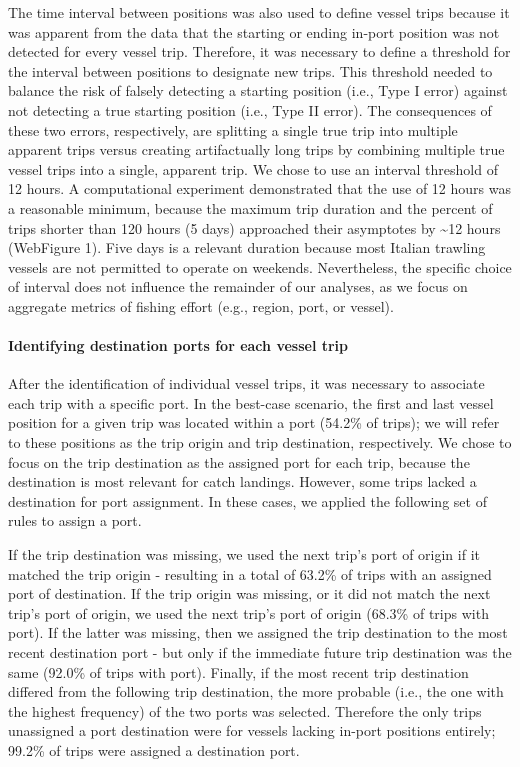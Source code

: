 \documentclass[11pt,]{article}
\let\oldparagraph\paragraph
\renewcommand{\paragraph}[1]{\oldparagraph{#1}\mbox{}}
\begin{document}
The time interval between positions was also used to define vessel trips
because it was apparent from the data that the starting or ending
in-port position was not detected for every vessel trip. Therefore, it
was necessary to define a threshold for the interval between positions
to designate new trips. This threshold needed to balance the risk of
falsely detecting a starting position (i.e., Type I error) against not
detecting a true starting position (i.e., Type II error). The
consequences of these two errors, respectively, are splitting a single
true trip into multiple apparent trips versus creating artifactually
long trips by combining multiple true vessel trips into a single,
apparent trip. We chose to use an interval threshold of 12 hours. A
computational experiment demonstrated that the use of 12 hours was a
reasonable minimum, because the maximum trip duration and the percent of
trips shorter than 120 hours (5 days) approached their asymptotes by
\textasciitilde{}12 hours (WebFigure 1). Five days is a relevant
duration because most Italian trawling vessels are not permitted to
operate on weekends. Nevertheless, the specific choice of interval does
not influence the remainder of our analyses, as we focus on aggregate
metrics of fishing effort (e.g., region, port, or vessel).

\paragraph{Identifying destination ports for each vessel
trip}\label{identifying-destination-ports-for-each-vessel-trip}

After the identification of individual vessel trips, it was necessary to
associate each trip with a specific port. In the best-case scenario, the
first and last vessel position for a given trip was located within a
port (54.2\% of trips); we will refer to these positions as the trip
origin and trip destination, respectively. We chose to focus on the trip
destination as the assigned port for each trip, because the destination
is most relevant for catch landings. However, some trips lacked a
destination for port assignment. In these cases, we applied the
following set of rules to assign a port.

If the trip destination was missing, we used the next trip's port of
origin if it matched the trip origin - resulting in a total of 63.2\% of
trips with an assigned port of destination. If the trip origin was
missing, or it did not match the next trip's port of origin, we used the
next trip's port of origin (68.3\% of trips with port). If the latter
was missing, then we assigned the trip destination to the most recent
destination port - but only if the immediate future trip destination was
the same (92.0\% of trips with port). Finally, if the most recent trip
destination differed from the following trip destination, the more
probable (i.e., the one with the highest frequency) of the two ports was
selected. Therefore the only trips unassigned a port destination were
for vessels lacking in-port positions entirely; 99.2\% of trips were
assigned a destination port.
\end{document}
